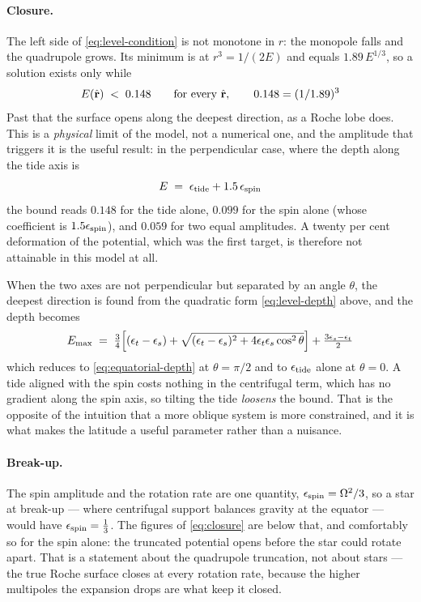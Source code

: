 \paragraph{Closure.}  The left side of \eqref{eq:level-condition} is not monotone in $r$: the monopole falls and
the quadrupole grows.  Its minimum is at $r^3 = 1/(2E)$ and equals
$1.89\,E^{1/3}$, so a solution exists only while
\begin{equation}
  E(\hat{\mathbf r}) \;<\; 0.148 \qquad \text{for every } \hat{\mathbf r} ,
  \qquad 0.148 = (1/1.89)^3
  \label{eq:closure}
\end{equation}
Past that the surface opens along the deepest direction, as a Roche lobe does.  This is a
\emph{physical} limit of the model, not a numerical one, and the amplitude that triggers it
is the useful result: in the perpendicular case, where the depth along the tide axis is
\begin{equation}
  E \;=\; \epsilon_\text{tide} + 1.5\,\epsilon_\text{spin}
  \label{eq:equatorial-depth}
\end{equation}
the bound reads $0.148$ for the tide alone, $0.099$ for the spin alone (whose coefficient
is $1.5\epsilon_\text{spin}$), and $0.059$ for two equal amplitudes.  A twenty per cent
deformation of the potential, which was the first target, is therefore not attainable in
this model at all.

When the two axes are not perpendicular but separated by an angle $\theta$, the deepest
direction is found from the quadratic form \eqref{eq:level-depth} above, and the depth
becomes
\begin{equation}
  E_\text{max} \;=\; \tfrac34\Bigl[(\epsilon_t-\epsilon_s)
    + \sqrt{(\epsilon_t-\epsilon_s)^2 + 4\epsilon_t\epsilon_s\cos^2\theta}\Bigr]
    + \tfrac{3\epsilon_s-\epsilon_t}{2}
  \label{eq:depth-latitude}
\end{equation}
which reduces to \eqref{eq:equatorial-depth} at $\theta = \pi/2$ and to
$\epsilon_\text{tide}$ alone at $\theta = 0$.  A tide aligned with the spin costs nothing in
the centrifugal term, which has no gradient along the spin axis, so tilting the tide
\emph{loosens} the bound.  That is the opposite of the intuition that a more oblique system
is more constrained, and it is what makes the latitude a useful parameter rather than a
nuisance.

\paragraph{Break-up.}  The spin amplitude and the rotation rate are one quantity,
$\epsilon_\text{spin} = \Omega^2/3$, so a star at break-up --- where centrifugal support
balances gravity at the equator --- would have $\epsilon_\text{spin} = \tfrac13$.  The figures of \eqref{eq:closure} are below that, and comfortably so for the spin
alone: the truncated potential opens before the star could rotate apart.  That is a statement
about the quadrupole truncation, not about stars --- the true Roche surface closes at every
rotation rate, because the higher multipoles the expansion drops are what keep it closed.

